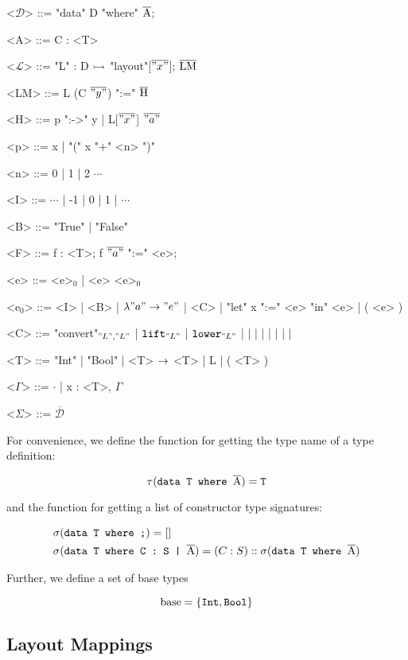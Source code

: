 \documentclass[10pt]{article}
\begin{document}
\begin{grammar}
  <$\mathcal{D}$> ::= "data" D "where" $\overline{\textnormal{A}}$;

  <A> ::= C : <T>

  <$\mathcal{L}$> ::= "L" : D $\rightarrowtail$ "layout"[$\overline{"x"}$]; $\overline{\textnormal{LM}}$

  <LM> ::= L (C $\overline{"y"}$) ":=" $\overline{\textnormal{H}}$

  <H> ::= p ":->" y | L[$\overline{"x"}$] $\overline{"a"}$

  <p> ::= x | "(" x "+" <n> ")"

  <n> ::= 0 | 1 | 2 $\cdots$

  <I> ::= $\cdots$ | -1 | 0 | 1 | $\cdots$

  <B> ::= "True" | "False"

  <F> ::= f : <T>; f $\overline{"a"}$ ":=" <e>;

  <e> ::= <e>$_0$ | <e> <e>$_0$

  <e$_0$> ::= <I> | <B> | $\lambda "a" \rightarrow "e"$ | <C> | "let" x ":=" <e> "in" <e> | ( <e> )

  <C> ::= "convert"$_{"L","L"}$ | $\textnormal{\texttt{lift}}_{"L"}$ | $\textnormal{\texttt{lower}}_{"L"}$ | \ite\; | \lesseq\; | \eq\; | \add\; | \sub\; | \; | \; | 

  <T> ::= "Int" | "Bool" | <T> $\rightarrow$ <T> | L | ( <T> )

  <$\Gamma$> ::= $\cdot$ | x : <T>, $\Gamma$

  <$\Sigma$> ::= $\overline{\mathcal{D}}$
\end{grammar}

\noindent
For convenience, we define the function for getting the type name of a type definition:

\[
  \tau(\texttt{data T where }\overline{\textnormal{A}}) = \texttt{T}
\]

and the function for getting a list of constructor type signatures:

\begin{align*}
  &\sigma(\texttt{data T where ;}) = []
  \\
  &\sigma(\texttt{data T where C : S | }\overline{\textnormal{A}}) = (C : S) :: \sigma({\texttt{data T where }}\overline{\textnormal{A}})
\end{align*}

Further, we define a set of base types

\[
  \textnormal{base} = \{\texttt{Int}, \texttt{Bool}\}
\]

\subsection{Layout Mappings}
\end{document}
